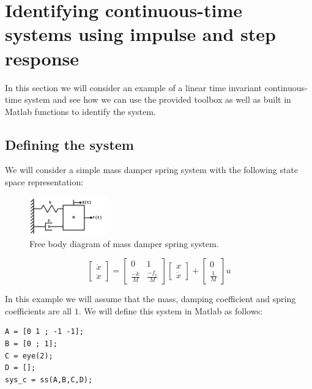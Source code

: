 \section{Identifying continuous-time systems using impulse and step response}
In this section we will consider an example of a linear time invariant continuous-time system and see how we can use the provided toolbox as well as built in Matlab functions to identify the system.

\subsection{Defining the system}
We will consider a simple mass damper spring system with the following state space representation:

\begin{figure}[H]
	\centering
	\includegraphics[width=0.3\textwidth]{MSD.png}
	\caption{Free body diagram of mass damper spring system.}
\end{figure}

\begin{equation*}
\begin{bmatrix}
\dot{x} \\ \ddot{x}
\end{bmatrix} = 
\begin{bmatrix}
0 & 1 \\ \frac{-k}{M} & \frac{-f_v}{M}
\end{bmatrix}  
\begin{bmatrix}
x \\ \dot{x}
\end{bmatrix} +
\begin{bmatrix}
0 \\ \frac{1}{M}
\end{bmatrix} 
u
\end{equation*}

In this example we will assume that the mass, damping coefficient and spring coefficients are all $1$. We will define this system in Matlab as follows:

\begin{lstlisting}
A = [0 1 ; -1 -1];
B = [0 ; 1];
C = eye(2);
D = [];
sys_c = ss(A,B,C,D);
\end{lstlisting}

